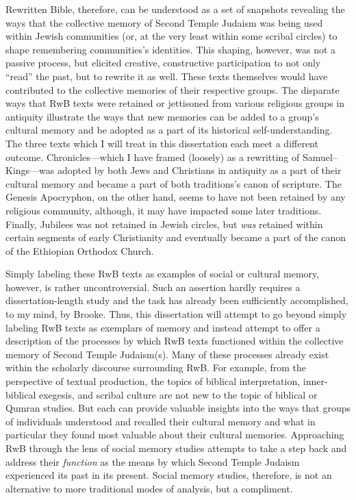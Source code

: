 Rewritten Bible, therefore, can be understood as a set of snapshots
revealing the ways that the collective memory of Second Temple Judaism
was being used within Jewish communities (or, at the very least within
some scribal circles) to shape remembering communities's identities.
This shaping, however, was not a passive process, but elicited creative,
constructive participation to not only ``read'' the past, but to rewrite
it as well. These texts themselves would have contributed to the
collective memories of their respective groups. The disparate ways that
RwB texts were retained or jettisoned from various religious groups in
antiquity illustrate the ways that new memories can be added to a
group's cultural memory and be adopted as a part of its historical
self-understanding. The three texts which I will treat in this
dissertation each meet a different outcome. Chronicles---which I have
framed (loosely) as a rewritting of Samuel--Kings---was adopted by both
Jews and Christians in antiquity as a part of their cultural memory and
became a part of both traditions's canon of scripture. The
Genesis Apocryphon, on the other hand, seems to have not been retained
by any religious community, although, it may have impacted some later
traditions. Finally, Jubilees was not retained in Jewish circles, but
\emph{was} retained within certain segments of early Christianity and
eventually became a part of the canon of the Ethiopian Orthodox Church.

Simply labeling these RwB texts as examples of social or cultural
memory, however, is rather uncontroversial. Such an assertion hardly
requires a dissertation-length study and the task has already been
sufficiently accomplished, to my mind, by
Brooke.\autocite{brooke_zsengeller2014} Thus, this dissertation will
attempt to go beyond simply labeling RwB texts as exemplars of memory
and instead attempt to offer a description of the processes by which RwB
texts functioned within the collective memory of Second Temple
Judaism(s). Many of these processes already exist within the scholarly
discourse surrounding RwB. For example, from the perspective of textual
production, the topics of biblical interpretation, inner-biblical
exegesis, and scribal culture are not new to the topic of biblical or
Qumran studies. But each can provide valuable insights into the ways
that groups of individuals understood and recalled their cultural memory
and what in particular they found most valuable about their cultural
memories. Approaching RwB through the lens of social memory studies
attempts to take a step back and address their \emph{function} as the
means by which Second Temple Judaism experienced its past in its
present. Social memory studies, therefore, is not an alternative to more
traditional modes of analysis, but a compliment.
